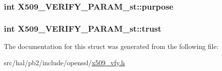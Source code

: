 \subsubsection[{\texorpdfstring{purpose}{purpose}}]{\setlength{\rightskip}{0pt plus 5cm}int X509\+\_\+\+V\+E\+R\+I\+F\+Y\+\_\+\+P\+A\+R\+A\+M\+\_\+st\+::purpose}\hypertarget{struct_x509___v_e_r_i_f_y___p_a_r_a_m__st_acae8fafa928701889f757951552f5ee9}{}\label{struct_x509___v_e_r_i_f_y___p_a_r_a_m__st_acae8fafa928701889f757951552f5ee9}
\subsubsection[{\texorpdfstring{trust}{trust}}]{\setlength{\rightskip}{0pt plus 5cm}int X509\+\_\+\+V\+E\+R\+I\+F\+Y\+\_\+\+P\+A\+R\+A\+M\+\_\+st\+::trust}\hypertarget{struct_x509___v_e_r_i_f_y___p_a_r_a_m__st_a7b7d5b079ed79cb2399ad471d1b57415}{}\label{struct_x509___v_e_r_i_f_y___p_a_r_a_m__st_a7b7d5b079ed79cb2399ad471d1b57415}


The documentation for this struct was generated from the following file\+:\begin{DoxyCompactItemize}
\item 
src/hal/pb2/include/openssl/\hyperlink{x509__vfy_8h}{x509\+\_\+vfy.\+h}\end{DoxyCompactItemize}
